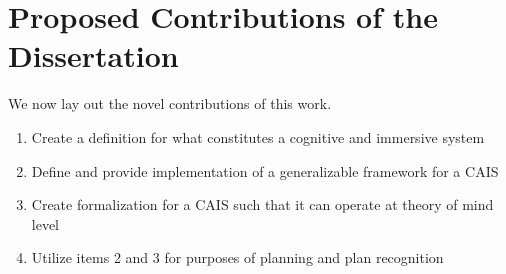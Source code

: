 \section{Proposed Contributions of the Dissertation}

We now lay out the novel contributions of this work. 

\begin{enumerate}
    \item Create a definition for what constitutes a cognitive and immersive system
    \item Define and provide implementation of a generalizable framework for a CAIS
    \item Create formalization for a CAIS such that it can operate at theory of mind level
    \item Utilize items 2 and 3 for purposes of planning and plan recognition
\end{enumerate}